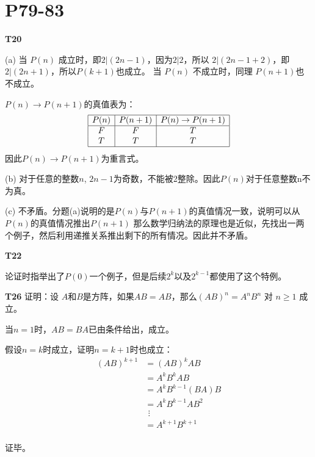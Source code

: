 \documentclass{article}
\begin{document}
\section{\textbf{P79-83}}

\textbf{T20}

(a) 当 $P(n)$ 成立时，即$2 | (2n - 1)$，因为$2 | 2$，所以 $2 | (2n - 1 + 2)$，即$2 | (2n + 1)$，所以$P(k + 1)$也成立。
当 $P(n)$ 不成立时，同理 $P(n + 1)$也不成立。

$P(n) \rightarrow P(n + 1)$的真值表为：\[
\begin{array}{|c|c|c|}
    \hline
    P(n) & P(n + 1) & P(n) \rightarrow P(n + 1)\\
    \hline
    F & F & T\\
    T & T & T\\
    \hline
\end{array}
\]
因此$P(n) \rightarrow P(n + 1)$为重言式。

(b) 对于任意的整数$n$, $2n - 1$为奇数，不能被2整除。因此$P(n)$对于任意整数n不为真。

(c) 不矛盾。分题(a)说明的是$P(n)$与$P(n + 1)$的真值情况一致，说明可以从$P(n)$的真值情况推出$P(n + 1)$
那么数学归纳法的原理也是近似，先找出一两个例子，然后利用递推关系推出剩下的所有情况。因此并不矛盾。\\

\vspace{10pt}

\textbf{T22}

论证时指举出了$P(0)$一个例子，但是后续$2^k$以及$2^{k-1}$都使用了这个特例。\\

\vspace{10pt}

\textbf{T26} 证明：设 $A$和$B$是方阵，如果$AB = AB$，那么$(AB)^n = A^nB^n$ 对 $n \geqslant 1$ 成立。

当$n = 1$时，$AB=BA$已由条件给出，成立。

假设$n = k$时成立，证明$n = k + 1$时也成立：
\begin{align*}
    (AB)^{k + 1} &= (AB)^k AB\\
    &=A^kB^kAB\\
    &=A^kB^{k-1}(BA)B\\
    &=A^kB^{k-1}AB^2\\
    &\ \, \vdots\\
    &=A^{k+1}B^{k+1}\\
\end{align*}

证毕。\\
\end{document}
